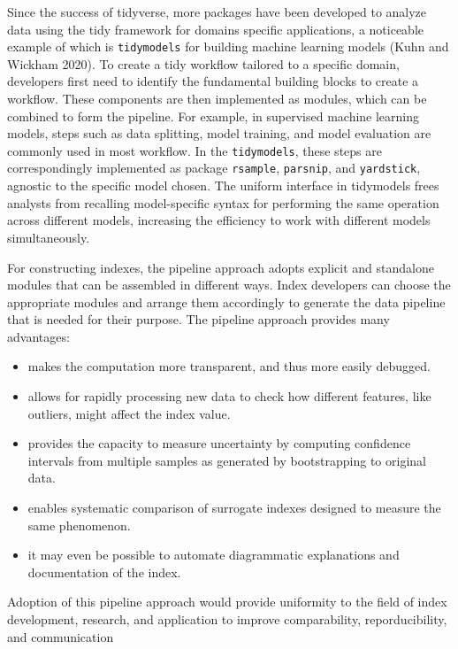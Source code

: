 \documentclass[
]{interact}
\providecommand{\tightlist}{%
  \setlength{\itemsep}{0pt}\setlength{\parskip}{0pt}}\usepackage{longtable,booktabs,array}
\begin{document}
Since the success of tidyverse, more packages have been developed to
analyze data using the tidy framework for domains specific applications,
a noticeable example of which is \texttt{tidymodels} for building
machine learning models (Kuhn and Wickham 2020). To create a tidy
workflow tailored to a specific domain, developers first need to
identify the fundamental building blocks to create a workflow. These
components are then implemented as modules, which can be combined to
form the pipeline. For example, in supervised machine learning models,
steps such as data splitting, model training, and model evaluation are
commonly used in most workflow. In the \texttt{tidymodels}, these steps
are correspondingly implemented as package \texttt{rsample},
\texttt{parsnip}, and \texttt{yardstick}, agnostic to the specific model
chosen. The uniform interface in tidymodels frees analysts from
recalling model-specific syntax for performing the same operation across
different models, increasing the efficiency to work with different
models simultaneously.

For constructing indexes, the pipeline approach adopts explicit and
standalone modules that can be assembled in different ways. Index
developers can choose the appropriate modules and arrange them
accordingly to generate the data pipeline that is needed for their
purpose. The pipeline approach provides many advantages:

\begin{itemize}
\tightlist
\item
  makes the computation more transparent, and thus more easily debugged.
\item
  allows for rapidly processing new data to check how different
  features, like outliers, might affect the index value.
\item
  provides the capacity to measure uncertainty by computing confidence
  intervals from multiple samples as generated by bootstrapping to
  original data.
\item
  enables systematic comparison of surrogate indexes designed to measure
  the same phenomenon.
\item
  it may even be possible to automate diagrammatic explanations and
  documentation of the index.
\end{itemize}

Adoption of this pipeline approach would provide uniformity to the field
of index development, research, and application to improve
comparability, reporducibility, and communication
\end{document}
